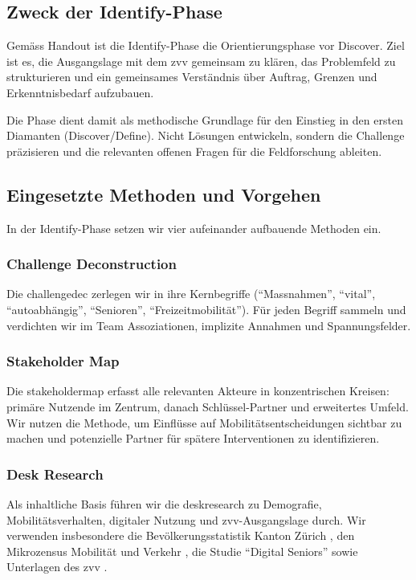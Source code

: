\subsection{Zweck der Identify-Phase}

Gemäss Handout ist die Identify-Phase die Orientierungsphase vor Discover.
Ziel ist es, die Ausgangslage mit dem \gls{zvv} gemeinsam zu klären, das Problemfeld zu strukturieren und ein gemeinsames Verständnis über Auftrag, Grenzen und Erkenntnisbedarf aufzubauen.

Die Phase dient damit als methodische Grundlage für den Einstieg in den ersten Diamanten (Discover/Define).
Nicht Lösungen entwickeln, sondern die Challenge präzisieren und die relevanten offenen Fragen für die Feldforschung ableiten.

\subsection{Eingesetzte Methoden und Vorgehen}

In der Identify-Phase setzen wir vier aufeinander aufbauende Methoden ein.

\subsubsection{Challenge Deconstruction}
Die \gls{challengedec} zerlegen wir in ihre Kernbegriffe (``Massnahmen'', ``vital'', ``autoabhängig'', ``Senioren'', ``Freizeitmobilität'').
Für jeden Begriff sammeln und verdichten wir im Team Assoziationen, implizite Annahmen und Spannungsfelder.

\subsubsection{Stakeholder Map}
Die \gls{stakeholdermap} erfasst alle relevanten Akteure in konzentrischen Kreisen: primäre Nutzende im Zentrum, danach Schlüssel-Partner und erweitertes Umfeld.
Wir nutzen die Methode, um Einflüsse auf Mobilitätsentscheidungen sichtbar zu machen und potenzielle Partner für spätere Interventionen zu identifizieren.

\subsubsection{Desk Research}
Als inhaltliche Basis führen wir die \gls{deskresearch} zu Demografie, Mobilitätsverhalten, digitaler Nutzung und \gls{zvv}-Ausgangslage durch.
Wir verwenden insbesondere die Bevölkerungsstatistik Kanton Zürich \cite{statzh2023}, den Mikrozensus Mobilität und Verkehr \cite{bfsare2021}, die Studie ``Digital Seniors'' \cite{sotomo2021} sowie Unterlagen des \gls{zvv} \cite{zvvbriefing2026}.


